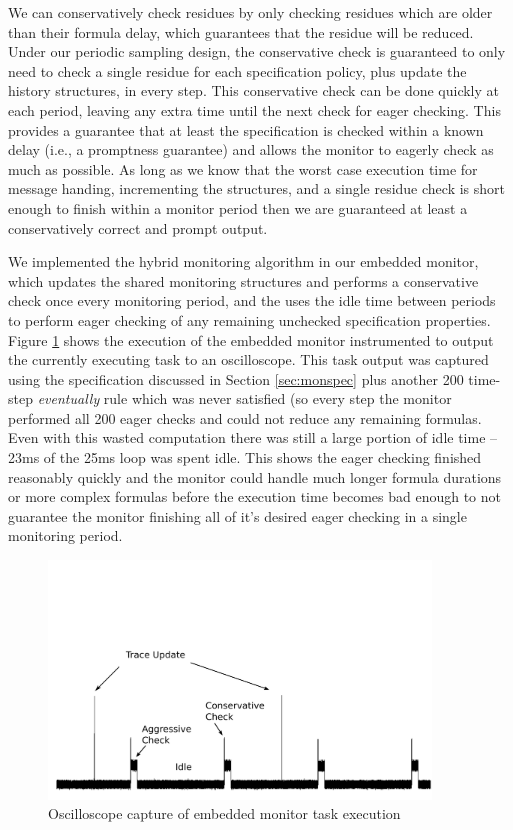 We can conservatively check \monitor residues by only checking residues which are older than their formula delay, which guarantees that the residue will be reduced.
%
Under our periodic sampling design, the conservative check is guaranteed to only need to check a single residue for each specification policy, plus update the history structures, in every step.
This conservative check can be done quickly at each period, leaving any extra time until the next check for eager checking. This provides a guarantee that at least the specification is checked within a known delay (i.e., a promptness guarantee) and allows the monitor to eagerly check as much as possible. 
As long as we know that the worst case execution time for message handing, incrementing the structures, and a single residue check is short enough to finish within a monitor period then we are guaranteed at least a conservatively correct and prompt output.

We implemented the hybrid monitoring algorithm in our embedded monitor, which updates the shared monitoring structures and performs a conservative check once every monitoring period, and the uses the idle time between periods to perform eager checking of any remaining unchecked specification properties.
%
Figure \ref{fig:arch:oscope} shows the execution of the embedded monitor instrumented to output the currently executing task to an oscilloscope. This task output was captured using the specification discussed in Section \ref{sec:monspec} plus another 200 time-step \emph{eventually} rule which was never satisfied (so every step the monitor performed all 200 eager checks and could not reduce any remaining formulas. Even with this wasted computation there was still a large portion of idle time -- 23ms of the 25ms loop was spent idle. This shows the eager checking finished reasonably quickly and the monitor could handle much longer formula durations or more complex formulas before the execution time becomes bad enough to not guarantee the monitor finishing all of it's desired eager checking in a single monitoring period. 

\begin{figure}
\includegraphics[width=4in]{img/scope_annotated}
\caption{Oscilloscope capture of embedded monitor task execution \label{fig:arch:oscope}}
\end{figure}
